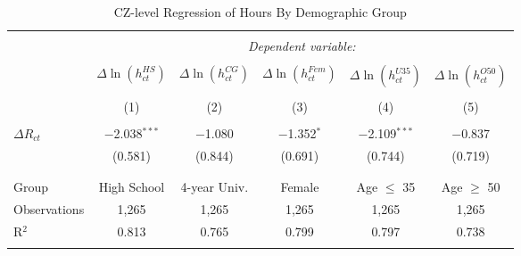 
\begin{table}[!t] \centering 
  \caption{CZ-level Regression of Hours By Demographic Group} 
  \label{cz_tab_8_panel_B} 
\begin{tabular}{@{\extracolsep{5pt}}lccccc} 
\\[-1.8ex]\hline 
\hline \\[-1.8ex] 
 & \multicolumn{5}{c}{\textit{Dependent variable:}} \\ 
\cline{2-6} 
\\[-1.8ex] & $\Delta \ln(h^{HS}_{ct})$ & $\Delta \ln(h^{CG}_{ct})$ & $\Delta \ln(h^{Fem}_{ct})$ & $\Delta \ln(h^{U35}_{ct})$ & $\Delta \ln(h^{O50}_{ct})$ \\ 
\\[-1.8ex] & (1) & (2) & (3) & (4) & (5)\\ 
\hline \\[-1.8ex] 
 $\Delta R_{ct}$ & $-$2.038$^{***}$ & $-$1.080 & $-$1.352$^{*}$ & $-$2.109$^{***}$ & $-$0.837 \\ 
  & (0.581) & (0.844) & (0.691) & (0.744) & (0.719) \\ 
  & & & & & \\ 
\hline \\[-1.8ex] 
Group & High School & 4-year Univ. & Female & Age $\leq$ 35 & Age $\geq$ 50 \\ 
Observations & 1,265 & 1,265 & 1,265 & 1,265 & 1,265 \\ 
R$^{2}$ & 0.813 & 0.765 & 0.799 & 0.797 & 0.738 \\ 
\hline 
\hline \\[-1.8ex] 
\end{tabular} 
\end{table} 
